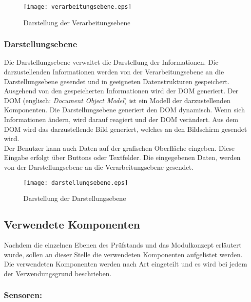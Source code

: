 \begin{figure}[h!]
\centering
\texttt{[image: verarbeitungsebene.eps]}
\caption{Darstellung der Verarbeitungsebene}
\label{abbildung_verarbeitungsebene}
\end{figure}

\subsubsection{Darstellungsebene}
Die Darstellungsebene verwaltet die Darstellung der Informationen. Die darzustellenden Informationen werden von der Verarbeitungsebene an die Darstellungsebene gesendet und in geeigneten Datenstrukturen gespeichert.
\\
Ausgehend von den gespeicherten Informationen wird der DOM generiert. Der DOM (englisch: \textit{Document Object Model}) ist ein Modell der darzustellenden Komponenten. Die Darstellungsebene generiert den DOM dynamisch. Wenn sich Informationen ändern, wird darauf reagiert und der DOM verändert. Aus dem DOM wird das darzustellende Bild generiert, welches an den Bildschirm gesendet wird.
\cite{dom_introduction}
\\
Der Benutzer kann auch Daten auf der grafischen Oberfläche eingeben. Diese Eingabe erfolgt über Buttons oder Textfelder. Die eingegebenen Daten, werden von der Darstellungsebene an die Verarbeitungsebene gesendet.

\begin{figure}[h]
\centering
\texttt{[image: darstellungsebene.eps]}
\caption{Darstellung der Darstellungsebene}
\label{abbildung_darstellungsebene}
\end{figure}

\subsection{Verwendete Komponenten}
Nachdem die einzelnen Ebenen des Prüfstands und das Modulkonzept erläutert wurde, sollen an dieser Stelle die verwendeten Komponenten aufgelistet werden. Die verwendeten Komponenten werden nach Art eingeteilt und es wird bei jedem der Verwendungsgrund beschrieben.

\subsubsection{Sensoren:}

